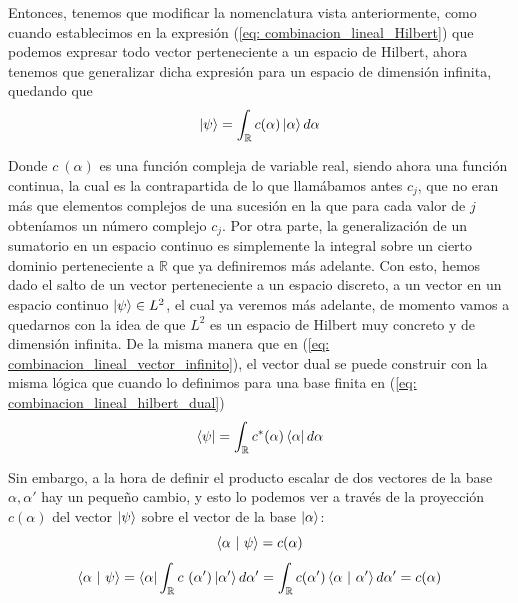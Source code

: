\documentclass{article}
\numberwithin{equation}{section} %
\begin{document}
    \vspace{2.5mm}

    Entonces, tenemos que modificar la nomenclatura vista anteriormente, como cuando establecimos en la expresión (\ref{eq: combinacion_lineal_Hilbert}) que podemos expresar todo vector perteneciente a un espacio de Hilbert, ahora tenemos que generalizar dicha expresión para un espacio de dimensión infinita, quedando que
    \begin{equation}
        \ket{\psi} = \int_{\mathbb{R}} c (\alpha) \ket{\alpha} d \alpha
        \label{eq: combinacion_lineal_vector_infinito}
    \end{equation}

    \vspace{2.5mm}

    Donde \( c \ (\alpha) \) es una función compleja de variable real, siendo ahora una función continua, la cual es la contrapartida de lo que llamábamos antes \( c_{j} \), que no eran más que elementos complejos de una sucesión en la que para cada valor de \( j \) obteníamos un número complejo \( c_{j} \). Por otra parte, la generalización de un sumatorio en un espacio continuo es simplemente la integral sobre un cierto dominio perteneciente a \( \mathbb{R} \) que ya definiremos más adelante. Con esto, hemos dado el salto de un vector perteneciente a un espacio discreto, a un vector en un espacio continuo \( \ket{\psi} \in L^{2} \), el cual ya veremos más adelante, de momento vamos a quedarnos con la idea de que \( L^{2} \) es un espacio de Hilbert muy concreto y de dimensión infinita. De la misma manera que en (\ref{eq: combinacion_lineal_vector_infinito}), el vector dual se puede construir con la misma lógica que cuando lo definimos para una base finita en (\ref{eq: combinacion_lineal_hilbert_dual})
    \begin{equation}
        \bra{\psi} = \int_{\mathbb{R}} c^{*} (\alpha) \bra{\alpha} d \alpha
    \end{equation}

    \vspace{2.5mm}

    Sin embargo, a la hora de definir el producto escalar de dos vectores de la base \( \alpha, \alpha' \) hay un pequeño cambio, y esto lo podemos ver a través de la proyección \( c (\alpha) \) del vector \( \ket{\psi} \) sobre el vector de la base \( \ket{\alpha} \):
    \begin{equation*}
        \braket{\alpha \ | \ \psi} = c (\alpha) 
    \end{equation*}
    \begin{equation*}
        \braket{\alpha \ | \ \psi} = \bra{\alpha} \int_{\mathbb{R}} c \ (\alpha') \ket{\alpha'} d \alpha' = \int_{\mathbb{R}} c (\alpha') \braket{\alpha \ | \ \alpha'} d \alpha' = c (\alpha)
    \end{equation*}
\end{document}
